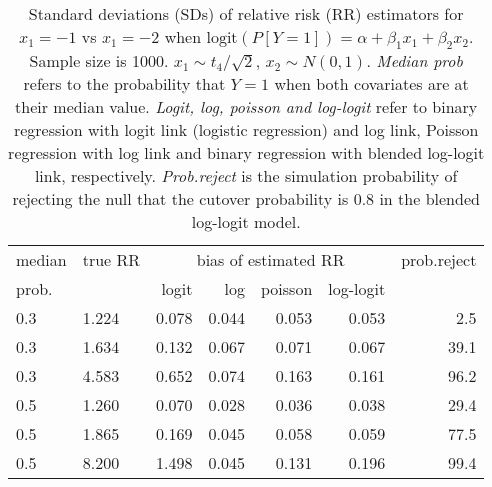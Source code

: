 \documentclass[12pt,a4paper]{article}
\begin{document}
\begin{table}[H] 
\small\sf\centering 
\caption{Standard deviations (SDs) of relative risk (RR) estimators for $x_1=-1$ vs $x_1=-2$ when $\mbox{logit}(P[Y=1])=\alpha+\beta_1 x_1 + \beta_2 x_2$. Sample size is 1000. $x_1 \sim $$t_4/\sqrt{2}$, $x_2 \sim N(0,1)$. {\it Median prob} refers to the probability that $Y=1$ when both covariates are at their median value. {\it Logit, log, poisson and log-logit} refer to binary regression with logit link (logistic regression) and log link, Poisson regression with log link and binary regression with blended log-logit link, respectively. {\it Prob.reject} is the simulation probability of rejecting the null that the cutover probability is $0.8$ in the blended log-logit model.} 
\begin{tabular}{llrrrrr} 
\toprule 
median & true RR & \multicolumn{4}{c}{bias of estimated RR} & prob.reject \\ 
prob. & & logit & log & poisson & log-logit  & \\ \midrule 
0.3 & 1.224 & 0.078 & 0.044 & 0.053 & 0.053 &  2.5 \\  
0.3 & 1.634 & 0.132 & 0.067 & 0.071 & 0.067 & 39.1 \\  
0.3 & 4.583 & 0.652 & 0.074 & 0.163 & 0.161 & 96.2 \\  
0.5 & 1.260 & 0.070 & 0.028 & 0.036 & 0.038 & 29.4 \\  
0.5 & 1.865 & 0.169 & 0.045 & 0.058 & 0.059 & 77.5 \\  
0.5 & 8.200 & 1.498 & 0.045 & 0.131 & 0.196 & 99.4 \\  
\bottomrule 
\end{tabular} 
\end{table} 
\end{document}
